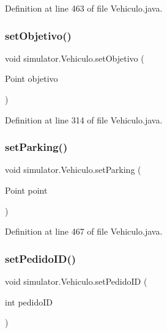 Definition at line 463 of file Vehiculo.\+java.

\mbox{\label{classsimulator_1_1_vehiculo_a1eb291b75826b406fc1eee91a92b9653}} 
\subsubsection{\texorpdfstring{set\+Objetivo()}{setObjetivo()}}
{\footnotesize\ttfamily void simulator.\+Vehiculo.\+set\+Objetivo (\begin{DoxyParamCaption}\item[{Point}]{objetivo }\end{DoxyParamCaption})}



Definition at line 314 of file Vehiculo.\+java.

\mbox{\label{classsimulator_1_1_vehiculo_a2515527cf1b20dfbd634f6bc54e3f8ad}} 
\subsubsection{\texorpdfstring{set\+Parking()}{setParking()}}
{\footnotesize\ttfamily void simulator.\+Vehiculo.\+set\+Parking (\begin{DoxyParamCaption}\item[{Point}]{point }\end{DoxyParamCaption})}



Definition at line 467 of file Vehiculo.\+java.

\mbox{\label{classsimulator_1_1_vehiculo_ac84b60f19a1fcfa901dc0be573edf80f}} 
\subsubsection{\texorpdfstring{set\+Pedido\+I\+D()}{setPedidoID()}}
{\footnotesize\ttfamily void simulator.\+Vehiculo.\+set\+Pedido\+ID (\begin{DoxyParamCaption}\item[{int}]{pedido\+ID }\end{DoxyParamCaption})}



